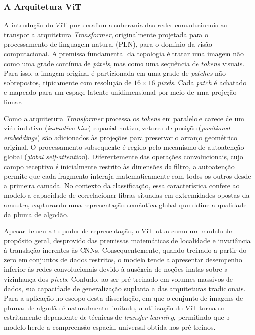     \subsubsection{A Arquitetura ViT}

        A introdução do ViT por  desafiou a soberania das redes convolucionais ao transpor a arquitetura \textit{Transformer}, originalmente projetada para o processamento de linguagem natural (PLN), para o domínio da visão computacional. A premissa fundamental da topologia é tratar uma imagem não como uma grade contínua de \textit{pixels}, mas como uma sequência de \textit{tokens} visuais. Para isso, a imagem original é particionada em uma grade de \textit{patches} não sobrepostos, tipicamente com resolução de $16 \times 16$ \textit{pixels}. Cada \textit{patch} é achatado e mapeado para um espaço latente unidimensional por meio de uma projeção linear.

        Como a arquitetura \textit{Transformer} processa os \textit{tokens} em paralelo e carece de um viés indutivo (\textit{inductive bias}) espacial nativo, vetores de posição (\textit{positional embeddings}) são adicionados às projeções para preservar o arranjo geométrico original. O processamento subsequente é regido pelo mecanismo de autoatenção global (\textit{global self-attention}). Diferentemente das operações convolucionais, cujo campo receptivo é inicialmente restrito às dimensões do filtro, a autoatenção permite que cada fragmento interaja matematicamente com todos os outros desde a primeira camada. No contexto da classificação, essa característica confere ao modelo a capacidade de correlacionar fibras situadas em extremidades opostas da amostra, capturando uma representação semântica global que define a qualidade da pluma de algodão.

        Apesar de seu alto poder de representação, o ViT atua como um modelo de propósito geral, desprovido das premissas matemáticas de localidade e invariância à translação inerentes às CNNs. Consequentemente, quando treinado a partir do zero em conjuntos de dados restritos, o modelo tende a apresentar desempenho inferior às redes convolucionais devido à ausência de noções inatas sobre a vizinhança dos \textit{pixels}. Contudo, ao ser pré-treinado em volumes massivos de dados, sua capacidade de generalização suplanta a das arquiteturas tradicionais. Para a aplicação no escopo desta dissertação, em que o conjunto de imagens de plumas de algodão é naturalmente limitado, a utilização do ViT torna-se estritamente dependente de técnicas de \textit{transfer learning}, permitindo que o modelo herde a compreensão espacial universal obtida nos pré-treinos.

